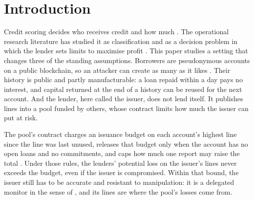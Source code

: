 \documentclass[preprint,11pt,authoryear]{elsarticle}
\begin{document}
\section{Introduction}

Credit scoring decides who receives credit and how much \citep{thomas2017credit}. The operational
research literature has studied it as classification \citep{lessmann2015benchmarking} and as a
decision problem in which the lender sets limits to maximise profit
\citep{crook2007recent}. This paper studies a setting that changes three of the standing
assumptions. Borrowers are pseudonymous accounts on a public blockchain, so an attacker can create as
many as it likes \citep{douceur2002sybil}. Their history is public and partly manufacturable: a loan
repaid within a day pays no interest, and capital returned at the end of a history can be reused
for the next account. And the lender, here called the issuer, does not lend itself. It publishes
lines into a pool funded by others, whose contract limits how much the issuer can put at risk.

The pool's contract charges an issuance budget on each account's highest line since the line was
last unused, releases that budget only when the account has no open loans and no commitments, and
caps how much one report may raise the total \citep{conservedcredit2026}. Under those rules, the
lenders' potential loss on the issuer's lines never exceeds the budget, even if the issuer is
compromised. Within that bound, the issuer still has to be accurate and resistant to manipulation:
it is a delegated monitor in the sense of \citet{diamond1984delegated}, and its lines are where the
pool's losses come from.
\end{document}

